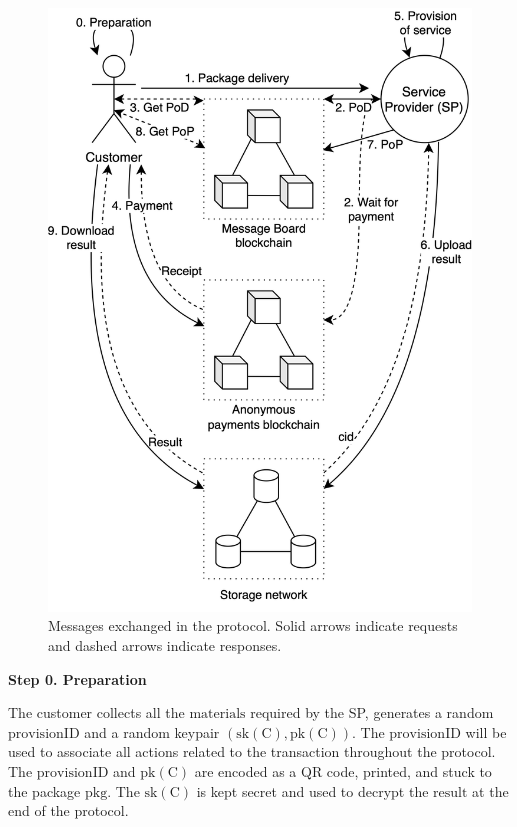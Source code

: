 \documentclass[pdftex,twocolumn,epjc3]{svjour3}
\begin{document}
{\begin{figure}[ht!]
\includegraphics[width=\linewidth]{anonser-protocol.png}
\centering
\caption{Messages exchanged in the protocol. Solid arrows indicate requests and dashed arrows indicate responses.}
\label{fig:protocol-diagram}
\end{figure}

\noindent \textbf
{Step 0.  Preparation}\label{step-0-preparation}

The customer collects all the $\mathrm{materials}$ required by the SP, generates a random $\mathrm{provisionID}$ and a random keypair $(\mathrm{sk(C)},\mathrm{pk(C)})$. The $\mathrm{provisionID}$ will be used to associate all actions related to the transaction throughout the protocol. The $\mathrm{provisionID}$ and $\mathrm{pk(C)}$ are encoded as a QR code, printed, and stuck to the package $\mathrm{pkg}$. The $\mathrm{sk(C)}$ is kept secret and used to decrypt the $\mathrm{result}$ at the end of the protocol.

}
\end{document}
